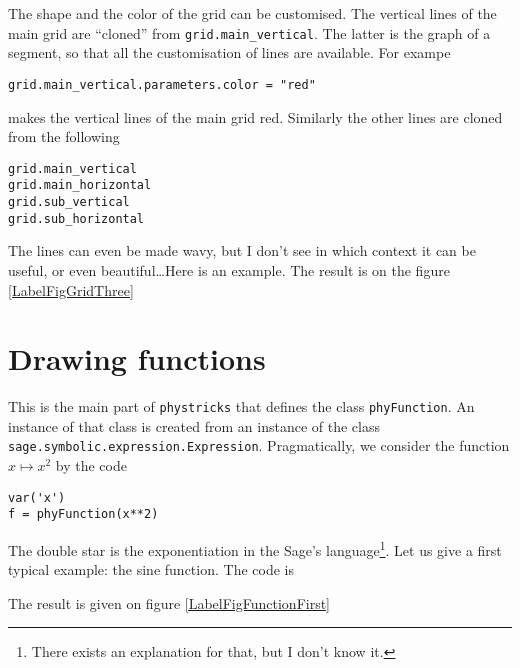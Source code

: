 The shape and the color of the grid can be customised. The vertical lines of the main grid are ``cloned'' from \verb+grid.main_vertical+. The latter is the graph of a segment, so that all the customisation of lines are available. For exampe
\begin{verbatim}
grid.main_vertical.parameters.color = "red"
\end{verbatim}
makes the vertical lines of the main grid red. Similarly the other lines are cloned from the following
\begin{verbatim}
grid.main_vertical
grid.main_horizontal
grid.sub_vertical
grid.sub_horizontal
\end{verbatim}
The lines can even be made wavy, but I don't see in which context it can be useful, or even beautiful\ldots Here is an example.
The result is on the figure \ref{LabelFigGridThree}
\newcommand{\CaptionFigGridThree}{Customised lines in a grid. The result here is not quite beautifull, but it's just an example.}


\section{Drawing functions}
\label{SecDrawFunctions}

This is the main part of \verb+phystricks+ that defines the class \verb+phyFunction+. An instance of that class is created from an instance of the class \verb+sage.symbolic.expression.Expression+. Pragmatically, we consider the function $x\mapsto x^2$ by the code
\begin{verbatim}
var('x')
f = phyFunction(x**2)
\end{verbatim}
The double star is the exponentiation in the Sage's language\footnote{There exists an explanation for that, but I don't know it.}. Let us give a first typical example: the sine function. The code is

The result is given on figure \ref{LabelFigFunctionFirst}
\newcommand{\CaptionFigFunctionFirst}{A first example of function.}


